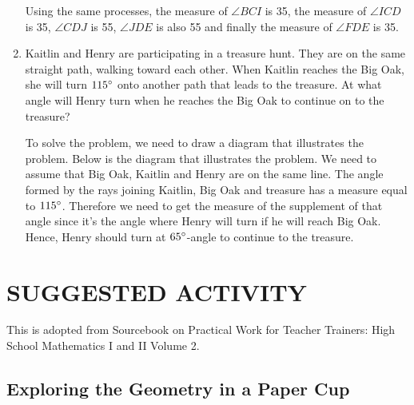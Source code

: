 \begin{enumerate}
Using the same processes, the measure of $\angle BCI$ is 35, the measure of $\angle ICD$ is 35, $\angle CDJ$ is 55, $\angle JDE$ is also 55 and finally the measure of $\angle FDE$ is 35.

\item Kaitlin and Henry are participating in a treasure hunt. They are on the same straight path,
walking toward each other. When Kaitlin reaches the Big Oak, she will turn $115\mathrm{^{\circ}}$ onto another
path that leads to the treasure. At what angle will Henry turn when he reaches the Big Oak to
continue on to the treasure?

\begin{center}
\end{center}

\Solution

To solve the problem, we need to draw a diagram that illustrates the problem. Below is
the diagram that illustrates the problem. We need to assume that Big Oak, Kaitlin and Henry are
on the same line. The angle formed by the rays joining Kaitlin, Big Oak and treasure has a
measure equal to $115\mathrm{^{\circ}}$. Therefore we need to get the measure of the supplement of that angle
since it's the angle where Henry will turn if he will reach Big Oak. Hence, Henry should turn at
$65\mathrm{^{\circ}}$-angle to continue to the treasure.
\end{enumerate}
\section*{SUGGESTED ACTIVITY}%
This is adopted from Sourcebook on Practical Work for Teacher Trainers: High School Mathematics I and
II Volume 2.
\subsection*{Exploring the Geometry in a Paper Cup}
